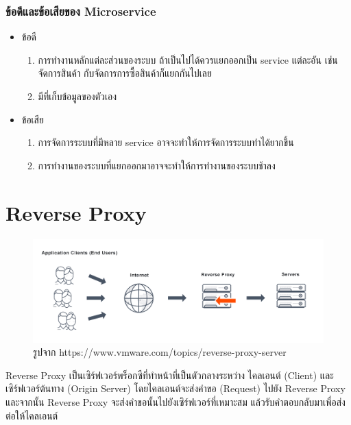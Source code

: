 \subsubsection{ข้อดีและข้อเสียของ Microservice}
\begin{itemize}
  \item ข้อดี
  \begin{enumerate}
    \item การทำงานหลักแต่ละส่วนของระบบ ถ้าเป็นไปได้ควรแยกออกเป็น service แต่ละอัน เช่นจัดการสินค้า กับจัดการการซื้อสินค้าก็แยกกันไปเลย
    \item มีที่เก็บข้อมูลของตัวเอง
  \end{enumerate}
  \item ข้อเสีย
  \begin{enumerate}
    \item การจัดการระบบที่มีหลาย service อาจจะทำให้การจัดการระบบทำได้ยากขึ้น
    \item การทำงานของระบบที่แยกออกมาอาจจะทำให้การทำงานของระบบช้าลง
  \end{enumerate}
\end{itemize}
\clearpage

\section{Reverse Proxy}
\begin{figure}[H]
  \centering
  \includegraphics[width=\linewidth, keepaspectratio]{pictures/reverse_proxy.png}
  \caption[Poem]{รูปจาก https://www.vmware.com/topics/reverse-proxy-server}
  \label{fig:reverse-proxy}
\end{figure}

\hspace{1.27cm}Reverse Proxy เป็นเซิร์ฟเวอร์พร็อกซีที่ทำหน้าที่เป็นตัวกลางระหว่าง ไคลเอนต์ (Client) และ เซิร์ฟเวอร์ต้นทาง (Origin Server) โดยไคลเอนต์จะส่งคำขอ (Request) ไปยัง Reverse Proxy และจากนั้น Reverse Proxy จะส่งคำขอนั้นไปยังเซิร์ฟเวอร์ที่เหมาะสม แล้วรับคำตอบกลับมาเพื่อส่งต่อให้ไคลเอนต์

